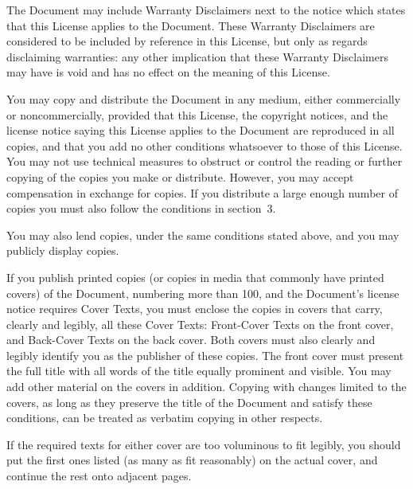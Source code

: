The Document may include Warranty Disclaimers next to the notice which
states that this License applies to the Document.  These Warranty
Disclaimers are considered to be included by reference in this
License, but only as regards disclaiming warranties: any other
implication that these Warranty Disclaimers may have is void and has
no effect on the meaning of this License.


\stopalignment

You may copy and distribute the Document in any medium, either
commercially or noncommercially, provided that this License, the
copyright notices, and the license notice saying this License applies
to the Document are reproduced in all copies, and that you add no other
conditions whatsoever to those of this License.  You may not use
technical measures to obstruct or control the reading or further
copying of the copies you make or distribute.  However, you may accept
compensation in exchange for copies.  If you distribute a large enough
number of copies you must also follow the conditions in section~3.

You may also lend copies, under the same conditions stated above, and
you may publicly display copies.


\stopalignment


If you publish printed copies (or copies in media that commonly have
printed covers) of the Document, numbering more than 100, and the
Document's license notice requires Cover Texts, you must enclose the
copies in covers that carry, clearly and legibly, all these Cover
Texts: Front-Cover Texts on the front cover, and Back-Cover Texts on
the back cover.  Both covers must also clearly and legibly identify
you as the publisher of these copies.  The front cover must present
the full title with all words of the title equally prominent and
visible.  You may add other material on the covers in addition.
Copying with changes limited to the covers, as long as they preserve
the title of the Document and satisfy these conditions, can be treated
as verbatim copying in other respects.

If the required texts for either cover are too voluminous to fit
legibly, you should put the first ones listed (as many as fit
reasonably) on the actual cover, and continue the rest onto adjacent
pages.

